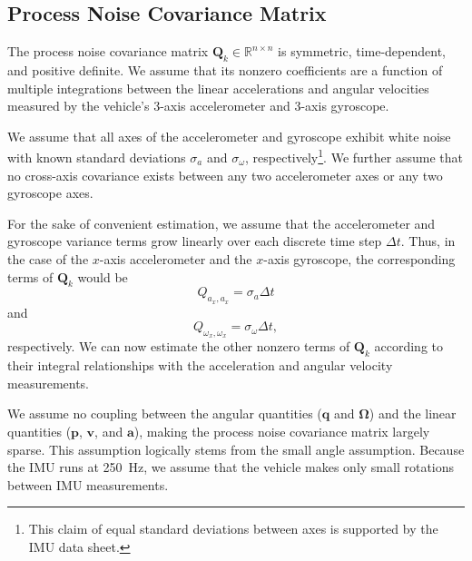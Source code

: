 \subsection{Process Noise Covariance Matrix} \label{sec:Q_Matrix}
The process noise covariance matrix $\mathbf{Q}_{k} \in \mathbb{R}^{n \times n}$ is symmetric, time-dependent, and positive definite. We assume that its nonzero coefficients are a function of multiple integrations between the linear accelerations and angular velocities measured by the vehicle's 3-axis accelerometer and 3-axis gyroscope.

We assume that all axes of the accelerometer and gyroscope exhibit white noise with known standard deviations $\sigma_{a}$ and $\sigma_{\omega}$, respectively\footnote{This claim of equal standard deviations between axes is supported by the IMU data sheet.}. We further assume that no cross-axis covariance exists between any two accelerometer axes or any two gyroscope axes.

For the sake of convenient estimation, we assume that the accelerometer and gyroscope variance terms grow linearly over each discrete time step $\Delta t$. Thus, in the case of the $x$-axis accelerometer and the $x$-axis gyroscope, the corresponding terms of $\mathbf{Q}_{k}$ would be
%
\begin{equation}
Q_{a_{x},a_{x}} = \sigma_{a} \Delta t
\end{equation}
%
and
%
\begin{equation}
Q_{\omega_{x},\omega_{x}} = \sigma_{\omega} \Delta t ,
\end{equation}
%
respectively. We can now estimate the other nonzero terms of $\mathbf{Q}_{k}$ according to their integral relationships with the acceleration and angular velocity measurements.


We assume no coupling between the angular quantities ($\mathbf{q}$ and $\bm{\Omega}$) and the linear quantities ($\mathbf{p}$, $\mathbf{v}$, and $\mathbf{a}$), making the process noise covariance matrix largely sparse. This assumption logically stems from the small angle assumption. Because the IMU runs at 250~Hz, we assume that the vehicle makes only small rotations between IMU measurements. 



